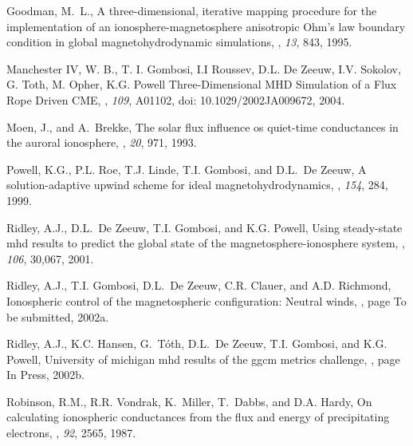 \documentclass[twoside,10pt]{article}
\begin{document}
\begin{thebibliography}{{\em Moen and Brekke}(1993}

Goodman, M.~L.,
\newblock A three-dimensional, iterative mapping procedure for the
  implementation of an ionosphere-magnetosphere anisotropic {Ohm's} law
  boundary condition in global magnetohydrodynamic simulations,
, {\em 13}, 843, 1995.

 Manchester IV,
W. B., T. I. Gombosi, I.I Roussev, D.L. De Zeeuw, I.V. Sokolov,
G. Toth, M. Opher, K.G. Powell \newblock Three-Dimensional MHD
Simulation of a Flux Rope Driven CME, , {\em 109}, A01102, doi: 10.1029/2002JA009672, 2004.

Moen, J., and A.~Brekke,
\newblock The solar flux influence os quiet-time conductances in the auroral
  ionosphere,
, {\em 20}, 971, 1993.

Powell, K.G., P.L. Roe, T.J. Linde, T.I. Gombosi, and D.L.~De Zeeuw,
\newblock A solution-adaptive upwind scheme for ideal magnetohydrodynamics,
, {\em 154}, 284, 1999.

Ridley, A.J., D.L.~De Zeeuw, T.I. Gombosi, and K.G. Powell,
\newblock Using steady-state mhd results to predict the global state of the
  magnetosphere-ionosphere system,
, {\em 106}, 30,067, 2001.

Ridley, A.J., T.I. Gombosi, D.L.~De Zeeuw, C.R. Clauer, and A.D. Richmond,
\newblock Ionospheric control of the magnetospheric configuration: Neutral
  winds,
, page To be submitted, 2002a.

Ridley, A.J., K.C. Hansen, G.~T\'oth, D.L.~De Zeeuw, T.I. Gombosi, and K.G.
  Powell,
\newblock University of michigan mhd results of the ggcm metrics challenge,
, page In Press, 2002b.

Robinson, R.M., R.R. Vondrak, K.~Miller, T.~Dabbs, and D.A. Hardy,
\newblock On calculating ionospheric conductances from the flux and energy of
  precipitating electrons,
, {\em 92}, 2565, 1987.

\end{thebibliography}
\end{document}
